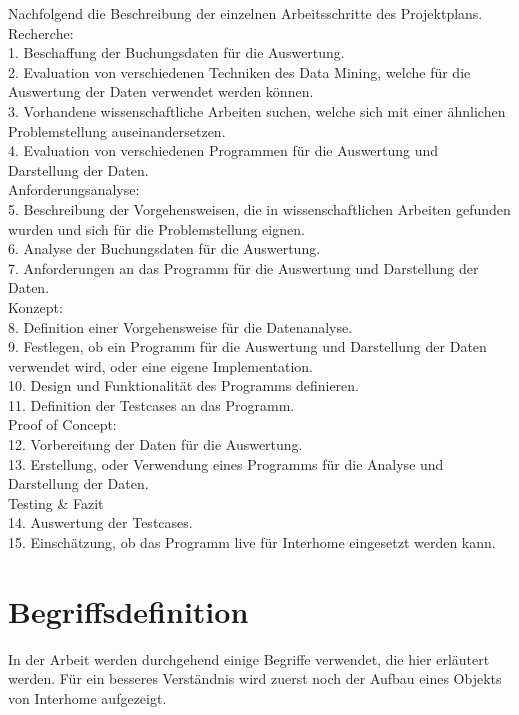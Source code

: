 {\parindent0pt %
Nachfolgend die Beschreibung der einzelnen Arbeitsschritte des Projektplans.\\

Recherche:\\
1. Beschaffung der Buchungsdaten für die Auswertung.\\
2. Evaluation von verschiedenen Techniken des Data Mining, welche für die Auswertung der Daten verwendet werden können.\\
3. Vorhandene wissenschaftliche Arbeiten suchen, welche sich mit einer ähnlichen Problemstellung auseinandersetzen.\\
4. Evaluation von verschiedenen Programmen für die Auswertung und Darstellung der Daten.\\

Anforderungsanalyse:\\
5. Beschreibung der Vorgehensweisen, die in wissenschaftlichen Arbeiten gefunden wurden und sich für die Problemstellung eignen. \\
6. Analyse der Buchungsdaten für die Auswertung.\\
7. Anforderungen an das Programm für die Auswertung und Darstellung der Daten.\\

Konzept:\\
8. Definition einer Vorgehensweise für die Datenanalyse.\\
9. Festlegen, ob ein Programm für die Auswertung und Darstellung der Daten verwendet wird, oder eine eigene Implementation.\\
10. Design und Funktionalität des Programms definieren.\\
11. Definition der Testcases an das Programm.\\

Proof of Concept:\\
12. Vorbereitung der Daten für die Auswertung.\\
13. Erstellung, oder Verwendung eines Programms für die Analyse und Darstellung der Daten.\\

Testing \& Fazit\\
14. Auswertung der Testcases.\\
15. Einschätzung, ob das Programm live für Interhome eingesetzt werden kann.
}

\section{Begriffsdefinition}
\label{sec:einletung:begriffsdefinition}
In der Arbeit werden durchgehend einige Begriffe verwendet, die hier erläutert werden. Für ein besseres Verständnis wird zuerst noch der Aufbau eines Objekts von Interhome aufgezeigt.

